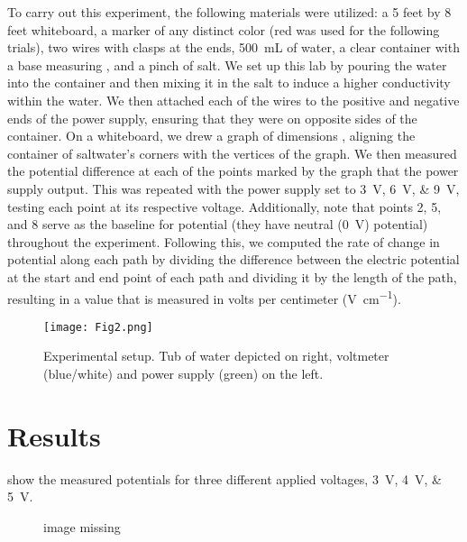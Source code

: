 ﻿\documentclass[10pt,journal,twoside]{IEEEtran}
\begin{document}
To carry out this experiment, the following materials were utilized: a 5 feet by 8 feet whiteboard, a marker of any distinct color (red was used for the following trials), two wires with clasps at the ends, \qty{500}{\milli\liter} of water, a clear container with a base measuring , and a pinch of salt. We set up this lab by pouring the water into the container and then mixing it in the salt to induce a higher conductivity within the water. We then attached each of the  wires to the positive and negative ends of the power supply, ensuring that they were on opposite sides of the container. On a whiteboard, we drew a graph of dimensions , aligning the container of saltwater’s corners with the vertices of the graph. We then measured the potential difference at each of the points marked by the graph that the power supply output. This was repeated with the power supply set to \qtylist{3;6;9}{\volt}, testing each point at its respective voltage.  Additionally, note that points 2, 5, and 8 serve as the baseline for potential (they have neutral (\qty{0}{\volt}) potential) throughout the experiment. Following this, we computed the rate of change in potential along each path by dividing the difference between the electric potential at the start and end point of each path and dividing it by the length of the path, resulting in a value that is measured in volts per centimeter (\unit{\volt\per\centi\meter}).

\begin{figure}
\begin{center}
\texttt{[image: Fig2.png]}
\end{center}
\caption{Experimental setup. Tub of water depicted on right, voltmeter (blue/white) and power supply (green) on the left.}
\label{fig:2}
\end{figure}










\section{Results}
 show the measured potentials for three different applied voltages, \qtylist{3;4;5}{\volt}. 
\begin{figure}
\begin{center}
image missing
\end{center}
\caption{}
\label{fig:3}
\end{figure}
\end{document}
